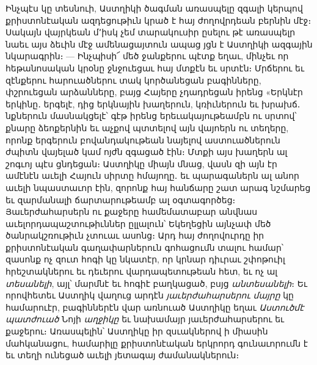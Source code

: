 \documentclass{article}
\begin{document}
{Ինչպէս կը տեսնուի, Աստղիկի ծագման առասպելը զգալի կերպով քրիստոնէական ազդեցութիւն կրած է հայ ժողովրդեան բերնին մէջ։ Սակայն վայրկեան մ՚իսկ չեմ տարակուսիր ըսելու թէ առասպելր նաեւ այս ձեւին մէջ ամենացայտուն ապաց յցն է Աստղիկի ազգային նկարագրին։ — Ինչպիսի՜ մեծ ջանքերու պէտք եղաւ, մինչեւ որ հեթանոսական կրօնը ջնջուեցաւ հայ մտքէն եւ սրտէն։ Մրճերու եւ զէնքերու հարուածներու տակ կործանեցան բագինները, փշրուեցան արձանները, բայց Հայերը չդադրեցան իրենց «Երկնէր երկինը․ երգելէ, դից երկնային խաղերուն, կռիւներուն եւ խրախճ․ նքներուն մասնակցելէ՝ գէթ իրենց երեւակայութեամբն ու սրտով՝ քնարը ձեոքերնին եւ աչքով պտտելով այն վայոերն ու տեղերը, որոնք երգերուն բովանդակութեան նայելով աստուածներուն ժպիտն վայելած կամ ոյժն զգացած էին։ Մտքի այս խաղերն ալ շոգւոյ պէս ցնդեցան։ Աստղիկը միայն մնաց, վասն զի այն էր ամէնէն աւելի Հայուն սիրտը հմայողը․ եւ պարագաներն ալ անոր աւելի նպաստաւոր էին, զորոնք հայ հանճարը շատ արագ նշմարեց եւ զարմանալի ճարտարութեամբ ալ օգտագործեց։ Յաւերժահարսերն ու քաջերը համեմատաբար անվնաս աւելորդապաշտութիւններ ըլլալուն՝ Եկեղեցին այնչափ մեծ ծանրակշռութիւն չտուաւ ասոնց։ Արդ հայ ժողովուրդը իր քրիստոնէական գաղափարներուն գոհացումն տալու համար՝ զասոնք ոչ զուտ հոգի կը նկատէր, որ կրնար դիւրաւ շփոթուիլ հրեշտակներու եւ դեւերու վարդապետութեան հետ, եւ ոչ ալ \emph{տեսանելի}, այլ՝ մարմնէ եւ հոգիէ բաղկացած, բսյց \emph{անտեսանելի}։ Եւ որովհետեւ Աստղիկ վաղուց արդէն \emph{յաւերժահարսերու մայրը} կը համարուէր, բագիններէն վար առնուած Աստղիկը եղաւ \emph{Աստուծմէ պատժուած} Նոյի \emph{աղջիկը} եւ նախամայր յաւերժահարսերու եւ քաջերու։ Առասպելին՝ Աստղիկը իր զսւակներով ի միասին մահկանացու, համարիլը քրիստոնէական երկրորդ գունաւորումն է եւ տեղի ունեցած աւելի յետագայ ժամանակներուն։

}
\end{document}

